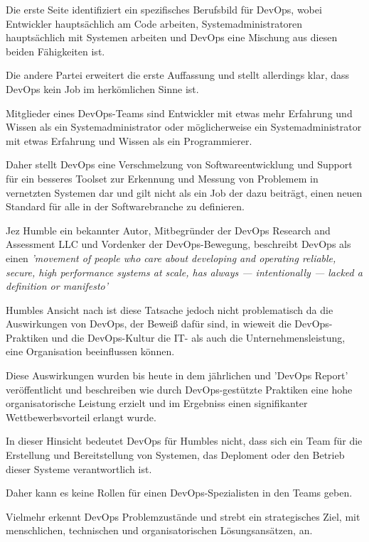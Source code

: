 Die erste Seite identifiziert ein spezifisches Berufsbild für DevOps, wobei Entwickler hauptsächlich am Code arbeiten, Systemadministratoren hauptsächlich mit Systemen arbeiten und DevOps eine Mischung aus diesen beiden Fähigkeiten ist. \cite{muller_whats_2010}

Die andere Partei erweitert die erste Auffassung und stellt allerdings klar, dass DevOps kein Job im herkömlichen Sinne ist. 

Mitglieder eines DevOps-Teams sind Entwickler mit etwas mehr Erfahrung und Wissen als ein Systemadministrator oder möglicherweise ein Systemadministrator mit etwas Erfahrung und Wissen als ein Programmierer. \cite{jones_how_2012}

Daher stellt DevOps eine Verschmelzung von Softwareentwicklung und Support für ein besseres Toolset zur Erkennung und Messung von Problemem in vernetzten Systemen dar und gilt nicht als ein Job der dazu beiträgt, einen neuen Standard für alle in der Softwarebranche zu definieren. \cite{roche_roche_2011} 

Jez Humble ein bekannter Autor, Mitbegründer der DevOps Research and Assessment LLC und Vordenker der DevOps-Bewegung, beschreibt DevOps als einen \textit{'movement of people who care about developing and operating reliable, secure, high performance systems at scale, has always — intentionally — lacked a definition or manifesto'} \cite{humble_state_2014}

Humbles Ansicht nach ist diese Tatsache jedoch nicht problematisch da die Auswirkungen von DevOps, der Beweiß dafür sind, in wieweit die DevOps-Praktiken und die DevOps-Kultur die IT- als auch die Unternehmensleistung, eine Organisation beeinflussen können. \cite{humble_state_2014}

Diese Auswirkungen wurden bis heute in dem jährlichen und 'DevOps Report' \cite{puppet_inc_2020_2021} veröffentlicht und beschreiben wie durch DevOps-gestützte Praktiken eine hohe organisatorische Leistung erzielt und im Ergebniss einen signifikanter Wettbewerbsvorteil erlangt wurde. 

In dieser Hinsicht bedeutet DevOps für Humbles nicht, dass sich ein Team für die Erstellung und Bereitstellung von Systemen, das Deploment oder den Betrieb dieser Systeme verantwortlich ist. \cite{humble_theres_2012}

Daher kann es keine Rollen für einen DevOps-Spezialisten in den Teams geben. 

Vielmehr erkennt DevOps Problemzustände und strebt ein strategisches Ziel, mit menschlichen, technischen und organisatorischen Lösungsansätzen, an. \cite{konig_devopswelcome_2019}\cite{dyck_towards_2015}

